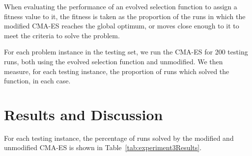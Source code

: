 \documentclass[sigconf]{acmart}
\begin{document}
When evaluating the performance of an evolved selection function to assign a fitness value to it, the fitness is taken as the proportion of the runs in which the modified CMA-ES reaches the global optimum, or moves close enough to it to meet the criteria to solve the problem.

For each problem instance in the testing set, we run the CMA-ES for 200 testing runs, both using the evolved selection function and unmodified. We then measure, for each testing instance, the proportion of runs which solved the function, in each case. 

\section{Results and Discussion}
\label{Results}

For each testing instance, the percentage of runs solved by the modified and unmodified CMA-ES is shown in Table~\ref{tab:experiment3Results}.
\end{document}
